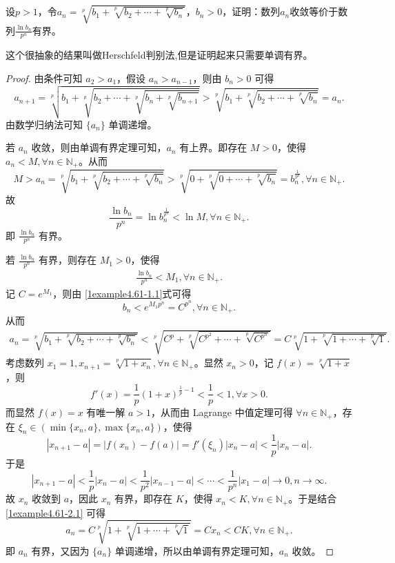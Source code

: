 \documentclass[lang=cn,newtx,10pt,scheme=chinese]{elegantbook}
\begin{document}
\begin{example}[$\,\,$Herschfeld判别法]\label{example:Herschfeld判别法}
设\(p > 1\)，令\(a_n=\sqrt[p]{b_1 + \sqrt[p]{b_2+\cdots+\sqrt[p]{b_n}}}\)，\(b_n>0\)，证明：数列\(a_n\)收敛等价于数列\(\frac{\ln b_n}{p^n}\)有界。
\end{example}
\begin{remark}
这个很抽象的结果叫做Herschfeld判别法,但是证明起来只需要单调有界。
\end{remark}
\begin{proof}
由条件可知 \(a_2 > a_1\)，假设 \(a_n > a_{n - 1}\)，则由 \(b_n > 0\) 可得
\[
a_{n + 1}=\sqrt[p]{b_1+\sqrt[p]{b_2+\cdots +\sqrt[p]{b_n+\sqrt[p]{b_{n + 1}}}}}>\sqrt[p]{b_1+\sqrt[p]{b_2+\cdots +\sqrt[p]{b_n}}}=a_n.
\]
由数学归纳法可知 \(\{ a_n \}\) 单调递增。

若 \(a_n\) 收敛，则由单调有界定理可知，\(a_n\) 有上界。即存在 \(M > 0\)，使得 \(a_n < M,\forall n\in \mathbb{N}_+\)。从而
\[
M > a_n=\sqrt[p]{b_1+\sqrt[p]{b_2+\cdots +\sqrt[p]{b_n}}}>\sqrt[p]{0+\sqrt[p]{0+\cdots +\sqrt[p]{b_n}}}=b_n^{\frac{1}{p^n}},\forall n\in \mathbb{N}_+.
\]
故
\[
\frac{\ln b_n}{p^n}=\ln b_n^{\frac{1}{p^n}}<\ln M,\forall n\in \mathbb{N}_+.
\]
即 \(\frac{\ln b_n}{p^n}\) 有界。

若 \(\frac{\ln b_n}{p^n}\) 有界，则存在 \(M_1 > 0\)，使得
\begin{align}
\frac{\ln b_n}{p^n}<M_1,\forall n\in \mathbb{N}_+. \label{1example4.61-1.1}
\end{align}
记 \(C = e^{M_1}\)，则由 \eqref{1example4.61-1.1}式可得
\[
b_n<e^{M_1p^n}=C^{p^n},\forall n\in \mathbb{N}_+.
\]
从而
\begin{align}
a_n=\sqrt[p]{b_1+\sqrt[p]{b_2+\cdots +\sqrt[p]{b_n}}}<\sqrt[p]{C^p+\sqrt[p]{C^{p^2}+\cdots +\sqrt[p]{C^{p^n}}}}=C\sqrt[p]{1+\sqrt[p]{1+\cdots +\sqrt[p]{1}}}. \label{1example4.61-2.1}
\end{align}
考虑数列 \(x_1 = 1,x_{n + 1}=\sqrt[p]{1 + x_n},\forall n\in \mathbb{N}_+\)。显然 \(x_n > 0\)，记 \(f(x)=\sqrt[p]{1 + x}\)，则
\[
f'(x)=\frac{1}{p}(1 + x)^{\frac{1}{p}-1}<\frac{1}{p}<1,\forall x > 0.
\]
而显然 \(f(x)=x\) 有唯一解 \(a > 1\)，从而由 Lagrange 中值定理可得 \(\forall n\in \mathbb{N}_+\)，存在 \(\xi_n\in(\min\{ x_n,a \},\max\{ x_n,a \})\)，使得
\[
|x_{n + 1}-a|=|f(x_n)-f(a)|=f'(\xi_n)|x_n - a|<\frac{1}{p}|x_n - a|.
\]
于是
\[
|x_{n + 1}-a|<\frac{1}{p}|x_n - a|<\frac{1}{p^2}|x_{n - 1}-a|<\cdots <\frac{1}{p^n}|x_1 - a|\rightarrow 0,n\rightarrow\infty.
\]
故 \(x_n\) 收敛到 \(a\)，因此 \(x_n\) 有界，即存在 \(K\)，使得 \(x_n < K,\forall n\in \mathbb{N}_+\)。于是结合 \eqref{1example4.61-2.1} 可得
\[
a_n=C\sqrt[p]{1+\sqrt[p]{1+\cdots +\sqrt[p]{1}}}=Cx_n<CK,\forall n\in \mathbb{N}_+.
\]
即 \(a_n\) 有界，又因为 \(\{ a_n \}\) 单调递增，所以由单调有界定理可知，\(a_n\) 收敛。
\end{proof}
\end{document}

